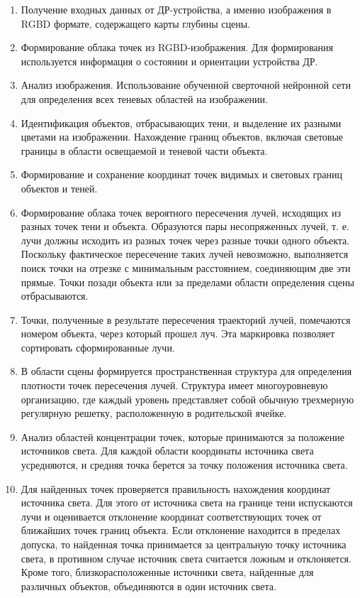 \begin{enumerate}
	\item Получение входных данных от ДР-устройства, а именно изображения в RGBD формате, содержащего карты глубины сцены.
	\item Формирование облака точек из RGBD-изображения. Для
	формирования используется информация о состоянии и ориентации устройства ДР.
	\item Анализ изображения. Использование обученной сверточной нейронной сети для определения всех теневых областей на изображении.
	\item Идентификация объектов, отбрасывающих тени, и выделение их разными цветами на изображении. Нахождение границ объектов, включая световые границы в области освещаемой и теневой части объекта.
	\item Формирование и сохранение координат точек видимых и световых границ объектов и теней. 
	\item Формирование облака точек вероятного пересечения лучей, исходящих из разных точек тени и объекта. Образуются пары несопряженных лучей, т. е. лучи должны исходить из разных точек через разные точки одного объекта. Поскольку фактическое пересечение таких лучей невозможно, выполняется поиск точки на отрезке с минимальным расстоянием, соединяющим две эти прямые. Точки позади объекта или за пределами области определения сцены отбрасываются. 
	\item Точки, полученные в результате пересечения траекторий лучей, помечаются номером объекта, через который прошел луч. Эта маркировка позволяет сортировать сформированные лучи.
	\item В области сцены формируется пространственная структура для определения плотности точек пересечения лучей. Структура имеет многоуровневую организацию, где каждый уровень представляет собой обычную трехмерную регулярную решетку, расположенную в родительской ячейке.
	\item Анализ областей концентрации точек, которые принимаются за положение источников света. Для каждой области координаты источника света усредняются, и средняя точка берется за точку положения источника света.
	\item Для найденных точек проверяется правильность нахождения координат источника света. Для этого от источника света на границе тени испускаются лучи и оценивается отклонение координат соответствующих точек от ближайших точек границ объекта. Если отклонение находится в пределах допуска, то найденная точка принимается за центральную точку источника света, в противном случае источник света считается ложным и отклоняется. Кроме того, близкорасположенные источники света, найденные для различных объектов, объединяются в один источник света.
\end{enumerate}

